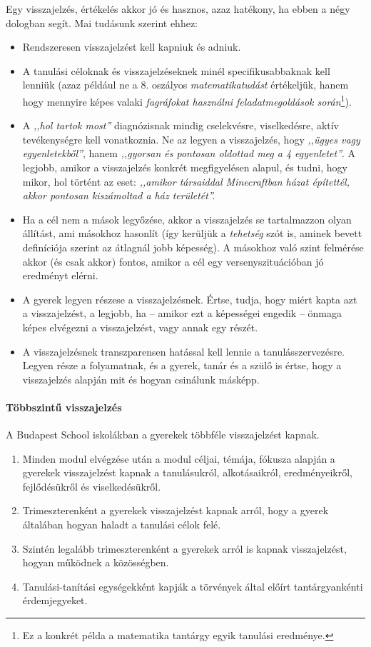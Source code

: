 Egy visszajelzés, értékelés akkor jó és hasznos, azaz hatékony, ha ebben a négy dologban segít. Mai tudásunk szerint ehhez:
\begin{itemize}
      \item Rendszeresen visszajelzést kell kapniuk és adniuk.
      \item A tanulási céloknak és visszajelzéseknek minél specifikusabbaknak kell lenniük (azaz például ne a 8. oszályos \emph{matematikatudást} értékeljük, hanem hogy mennyire képes valaki \emph{fagráfokat használni feladatmegoldások során}\footnote{Ez a konkrét példa a matematika tantárgy egyik tanulási eredménye.}).
      \item A \emph{,,hol tartok most''} diagnózisnak mindig cselekvésre, viselkedésre, aktív tevékenységre kell vonatkoznia. Ne az legyen a visszajelzés, hogy \emph{,,ügyes vagy egyenletekből''}, hanem \emph{,,gyorsan és       pontosan oldottad meg a 4 egyenletet''}. A legjobb, amikor a visszajelzés konkrét megfigyelésen alapul, és tudni, hogy mikor, hol történt az eset: \emph{,,amikor társaiddal Minecraftban házat építettél, akkor       pontosan kiszámoltad a ház területét''.}
      \item Ha a cél nem a mások legyőzése, akkor a visszajelzés se tartalmazzon olyan állítást, ami másokhoz hasonlít (így kerüljük a \emph{tehetség} szót is, aminek bevett definíciója szerint az átlagnál jobb képesség). A másokhoz való szint felmérése akkor (és csak akkor) fontos, amikor a cél egy versenyszituációban jó eredményt elérni.

      \item A gyerek legyen részese a visszajelzésnek. Értse, tudja, hogy miért kapta azt a visszajelzést, a legjobb, ha -- amikor ezt a képességei engedik -- önmaga képes elvégezni a visszajelzést, vagy annak egy részét.
      \item A visszajelzésnek transzparensen hatással kell lennie a tanulásszervezésre. Legyen része a folyamatnak, és a gyerek, tanár és a szülő is értse, hogy a visszajelzés alapján mit és hogyan csinálunk másképp.
\end{itemize}

\paragraph{Többszintű visszajelzés} A Budapest School iskolákban a gyerekek
többféle visszajelzést kapnak. \begin{enumerate}
      \item Minden modul elvégzése után a modul céljai, témája, fókusza alapján a gyerekek visszajelzést kapnak a tanulásukról, alkotásaikról, eredményeikről, fejlődésükről és viselkedésükről.
      \item Trimeszterenként a gyerekek visszajelzést kapnak arról, hogy a gyerek általában hogyan haladt a tanulási célok felé.
      \item Szintén legalább trimeszterenként a gyerekek arról is kapnak visszajelzést, hogyan működnek a közösségben.
      \item Tanulási-tanítási egységekként kapják a törvények által előírt tantárgyankénti érdemjegyeket.
\end{enumerate}

